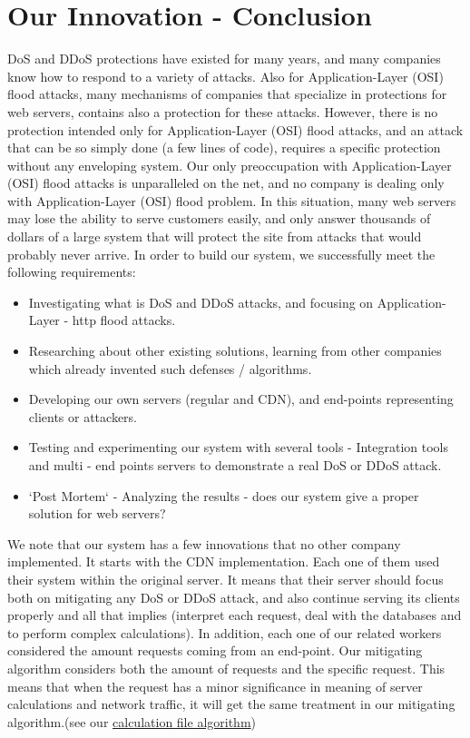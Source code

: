 \documentclass{report}
\begin{document}
\section {Our Innovation - Conclusion} 
\gls{DoS} and \gls{DDoS} protections have existed for many years, and many companies know how to respond to a variety of attacks. Also for Application-Layer (\gls{OSI}) flood attacks, many mechanisms of companies that specialize in protections for web servers, contains also a protection for these attacks.\hfill \break
However, there is no protection intended only for Application-Layer (\gls{OSI}) flood attacks, and an attack that can be so simply done (a few lines of code), requires a specific protection without any enveloping system.\hfill \break
Our only preoccupation with Application-Layer (\gls{OSI}) flood attacks is unparalleled on the net, and no company is dealing only with Application-Layer (\gls{OSI}) flood problem. In this situation, many web servers may lose the ability to serve customers easily, and only answer thousands of dollars of a large system that will protect the site from attacks that would probably never arrive.\hfill \break \hfill \break
In order to build our system, we successfully meet the following requirements:\hfill \break

\begin{itemize}

\item Investigating what is \gls{DoS} and \gls{DDoS} attacks, and focusing on Application-Layer - http flood attacks.
\item Researching about other existing solutions, learning from other companies which already invented such defenses / algorithms.
\item Developing our own servers (regular and \gls{CDN}), and end-points representing clients or attackers.
\item Testing and experimenting our system with several tools - Integration tools and multi - end points servers to demonstrate a real \gls{DoS} or \gls{DDoS} attack.
\item `Post Mortem` - Analyzing the results - does our system give a proper solution for web servers?

\end{itemize}

We note that our system has a few innovations that no other company implemented. It starts with the \gls{CDN} implementation. Each one of them used their system within the original server. It means that their server should focus both on mitigating any \gls{DoS} or \gls{DDoS} attack, and also continue serving its clients properly and all that implies (interpret each request, deal with the databases and to perform complex calculations).\hfill \break
In addition, each one of our related workers considered the amount requests coming from an end-point. Our mitigating algorithm considers both the amount of requests and the specific request. This means that when the request has a minor significance in meaning of server calculations and network traffic, it will get the same treatment in our mitigating algorithm.\hfill \break (see our \hyperref[sec:algo1]{calculation file algorithm})
\end{document}
